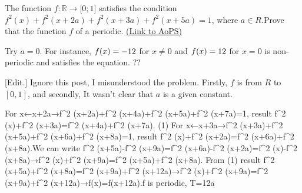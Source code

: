 \begin{problem}
	The function ${f: \mathbb{R}\to\mathbb[0;1]}$ satisfies the condition $f^2(x)+f^2(x+2a)+f^2(x+3a)+f^2(x+5a)=1$, where $a{\in}R$.Prove that the function $f$ of a periodic.
	\flushright \href{https://artofproblemsolving.com/community/c6h559309}{(Link to AoPS)}
\end{problem}



\begin{solution}
	Try $a=0$. 
For instance, $f(x)=-1\/2$ for $x\neq0$ and $f(x)=1\/2$ for $x=0$ is non-periodic and satisfies the equation. ??

[Edit.] Ignore this post, I misunderstood the problem. Firstly, $f$ is from $R$ to $[0,1]$, and secondly, It wasn't clear that $a$ is a given constant.
\end{solution}



\begin{solution}[by \href{https://artofproblemsolving.com/community/user/29428}{Try $a=0$. \nFor instance, $f(x)=-1\/2$ for $x\\neq0$ and $f(x)=1\/2$ for $x=0$ is non-periodic and satisfies the equation. ??\end{tcolorbox}\n$f(x)=-\\frac 12$ is impossible since $f(x)$ is from $\\mathbb R\\to [0,1]$","username":"pco}]
	[quote="ran
\end{solution}



\begin{solution}[by \href{https://artofproblemsolving.com/community/user/150054}{wer}]
	For x←x+2a→f^2 (x+2a)+f^2 (x+4a)+f^2 (x+5a)+f^2 (x+7a)=1,  result f^2 (x)+f^2 (x+3a)=f^2 (x+4a)+f^2 (x+7a). (1) For x←x+3a→f^2 (x+3a)+f^2 (x+5a)+f^2 (x+6a)+f^2 (x+8a)=1, result f^2 (x)+f^2 (x+2a)=f^2 (x+6a)+f^2 (x+8a).We can write f^2 (x+5a)-f^2 (x+9a)=f^2 (x+6a)-f^2 (x+2a)=f^2 (x)-f^2 (x+8a)→f^2 (x)+f^2 (x+9a)=f^2 (x+5a)+f^2 (x+8a). From (1) result f^2 (x+5a)+f^2 (x+8a)=f^2 (x+9a)+f^2 (x+12a)→f^2 (x)+f^2 (x+9a)=f^2 (x+9a)+f^2 (x+12a)→f(x)=f(x+12a).f is periodic, T=12a
\end{solution}




